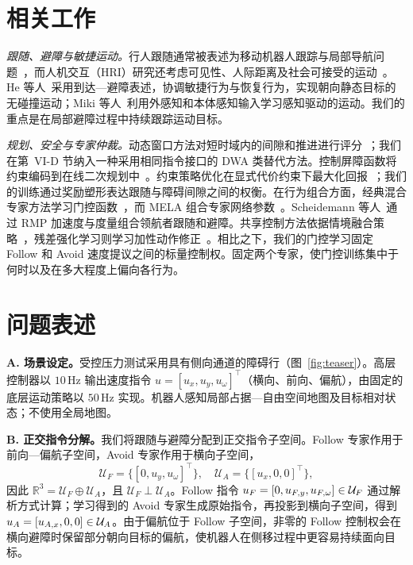 \section{相关工作}
\emph{跟随、避障与敏捷运动。}行人跟随通常被表述为移动机器人跟踪与局部导航问题~\cite{ref:personfollowing}，而人机交互（HRI）研究还考虑可见性、人际距离及社会可接受的运动~\cite{ref:socialfollow}。He 等人~\cite{ref:abs}采用到达—避障表述，协调敏捷行为与恢复行为，实现朝向静态目标的无碰撞运动；Miki 等人~\cite{ref:miki}利用外感知和本体感知输入学习感知驱动的运动。我们的重点是在局部避障过程中持续跟踪运动目标。

\emph{规划、安全与专家仲裁。}动态窗口方法对短时域内的间隙和推进进行评分~\cite{ref:dwa}；我们在第~VI-D 节纳入一种采用相同指令接口的 DWA 类替代方法。控制屏障函数将约束编码到在线二次规划中~\cite{ref:cbf}。约束策略优化在显式代价约束下最大化回报~\cite{ref:cpo}；我们的训练通过奖励塑形表达跟随与障碍间隙之间的权衡。在行为组合方面，经典混合专家方法学习门控函数~\cite{ref:moe}，而 MELA 组合专家网络参数~\cite{ref:mela}。Scheidemann 等人~\cite{ref:leaderfollow}通过 RMP 加速度与度量组合领航者跟随和避障。共享控制方法依据情境融合策略~\cite{ref:policyblend}，残差强化学习则学习加性动作修正~\cite{ref:residualrl}。相比之下，我们的门控学习固定 Follow 和 Avoid 速度提议之间的标量控制权。固定两个专家，使门控训练集中于何时以及在多大程度上偏向各行为。

\section{问题表述}
\textbf{A. 场景设定。}受控压力测试采用具有侧向通道的障碍行（图~\ref{fig:teaser}）。高层控制器以 $10\,\mathrm{Hz}$ 输出速度指令 $u=[u_x,u_y,u_\omega]^\top$（横向、前向、偏航），由固定的底层运动策略以 $50\,\mathrm{Hz}$ 实现。机器人感知局部占据—自由空间地图及目标相对状态；不使用全局地图。

\textbf{B. 正交指令分解。}我们将跟随与避障分配到正交指令子空间。Follow 专家作用于前向—偏航子空间，Avoid 专家作用于横向子空间，
\begin{equation}
\mathcal{U}_F=\{[0,u_y,u_\omega]^\top\},\quad
\mathcal{U}_A=\{[u_x,0,0]^\top\},
\end{equation}
因此 $\mathbb{R}^3=\mathcal{U}_F\oplus\mathcal{U}_A$，且 $\mathcal{U}_F\perp\mathcal{U}_A$。Follow 指令 $u_{F}=[0,u_{F,y},u_{F,\omega}]\in\mathcal{U}_F$ 通过解析方式计算；学习得到的 Avoid 专家生成原始指令，再投影到横向子空间，得到 $u_{A}=[u_{A,x},0,0]\in\mathcal{U}_A$。由于偏航位于 Follow 子空间，非零的 Follow 控制权会在横向避障时保留部分朝向目标的偏航，使机器人在侧移过程中更容易持续面向目标。

